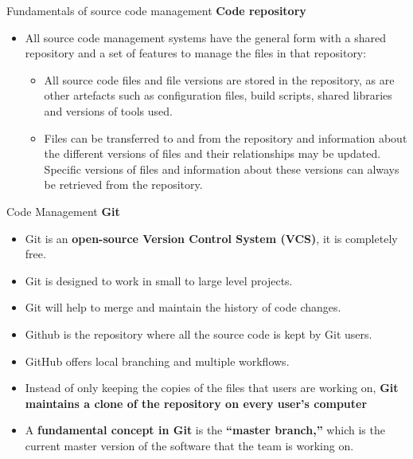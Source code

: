 \documentclass{beamer}
\begin{document}
\begin{frame}{Fundamentals of source code management}
	\textbf{Code repository}
	\begin{itemize}
		\item 	All source code management systems have the general form with a shared repository and a set of features to manage the files in that repository:
		
		\begin{itemize}
			\item All source code files and file versions are stored in the repository, as are other artefacts such as configuration files, build scripts, shared libraries and versions of tools used.
			\item Files can be transferred to and from the repository and information about the different versions of files and their relationships may be updated. Specific versions of files and information about these versions can always be retrieved from the repository.
			
		\end{itemize}
	\end{itemize}
\end{frame}

\begin{frame}{Code Management}
	\textbf{Git}
	\begin{itemize}
		\item Git is an \textbf{open-source Version Control System (VCS)}, it is completely free. 
		\item Git is designed to work in small to large level projects.
		\item  Git will help to merge and maintain the history of code changes.
		\item  Github is the repository where all the source code is kept by Git users.
		\item GitHub offers local branching and multiple workflows. 
		\item Instead of only keeping the copies of the files that users are working on, \textbf{Git maintains a clone of the repository on every user’s computer }
		\item A \textbf{fundamental concept in Git} is the \textbf{“master branch,”} which is the current master version of the software that the team is working on.
	\end{itemize}
\end{frame}
\end{document}
